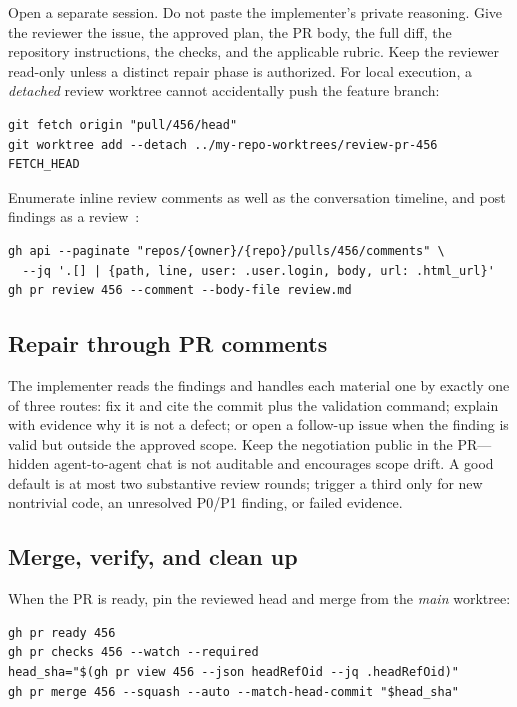 \documentclass[11pt]{article}
\begin{document}
Open a separate session. Do not paste the implementer's private reasoning. Give the reviewer the
issue, the approved plan, the PR body, the full diff, the repository instructions, the checks,
and the applicable rubric. Keep the reviewer read-only unless a distinct repair phase is
authorized. For local execution, a \emph{detached} review worktree cannot accidentally push the
feature branch:

\begin{lstlisting}[style=gw]
git fetch origin "pull/456/head"
git worktree add --detach ../my-repo-worktrees/review-pr-456 FETCH_HEAD
\end{lstlisting}

Enumerate inline review comments as well as the conversation timeline, and post findings as a
review~\cite{github2026prreview,github2026api}:

\begin{lstlisting}[style=gw]
gh api --paginate "repos/{owner}/{repo}/pulls/456/comments" \
  --jq '.[] | {path, line, user: .user.login, body, url: .html_url}'
gh pr review 456 --comment --body-file review.md
\end{lstlisting}

\subsection{Repair through PR comments}

The implementer reads the findings and handles each material one by exactly one of three routes:
fix it and cite the commit plus the validation command; explain with evidence why it is not a
defect; or open a follow-up issue when the finding is valid but outside the approved scope. Keep
the negotiation public in the PR---hidden agent-to-agent chat is not auditable and encourages
scope drift. A good default is at most two substantive review rounds; trigger a third only for
new nontrivial code, an unresolved P0/P1 finding, or failed evidence.

\subsection{Merge, verify, and clean up}

When the PR is ready, pin the reviewed head and merge from the \emph{main} worktree:

\begin{lstlisting}[style=gw]
gh pr ready 456
gh pr checks 456 --watch --required
head_sha="$(gh pr view 456 --json headRefOid --jq .headRefOid)"
gh pr merge 456 --squash --auto --match-head-commit "$head_sha"
\end{lstlisting}
\end{document}
